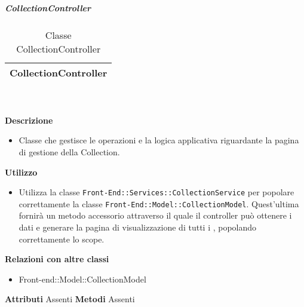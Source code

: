 			\subparagraph{CollectionController} 
\begin{table}[ht]
\begin{center}
\bgroup
	\setlength{\arrayrulewidth}{0.6mm}
	\def\arraystretch{1}
		\begin{tabular}{ | p{12cm} | }
				\hline  
					\centerline{\textbf{CollectionController}}
		\\ \hline 
				\hline
				\hline
		
		\end{tabular}
\egroup
\caption{Classe CollectionController}
\end{center}
\end{table} \textbf{\\ \\ Descrizione}
\begin{itemize}
\item[] Classe che gestisce le operazioni e la logica applicativa riguardante la pagina di gestione della Collection.
\end{itemize} 
\textbf{Utilizzo}
\begin{itemize}
\item[] Utilizza la classe \texttt{Front-End::Services::CollectionService} per popolare correttamente la classe \texttt{Front-End::Model::CollectionModel}. Quest'ultima fornirà un metodo accessorio attraverso il quale il controller può ottenere i dati e generare la pagina di visualizzazione di tutti i , popolando correttamente lo scope.
\end{itemize}
\textbf{Relazioni con altre classi}
\begin{itemize}
\item{Front-end::Model::CollectionModel}
\end{itemize}
\textbf{Attributi}
Assenti
\textbf{Metodi}
Assenti

